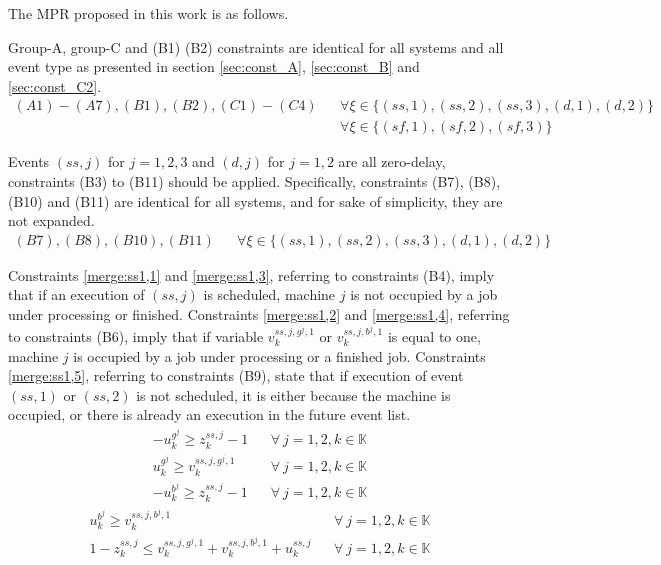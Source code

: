 \documentclass[suppldata]{interact}
\theoremstyle{plain}
\theoremstyle{definition}
\theoremstyle{remark}
\begin{document}
The MPR proposed in this work is as follows.

Group-A, group-C and (B1) (B2) constraints are identical for all systems and all event type as presented in section \ref{sec:const_A},  \ref{sec:const_B} and \ref{sec:const_C2}. 
\begin{eqnarray}
	(A1)-(A7),(B1),(B2),(C1)-(C4) && \forall \xi \in\{(ss,1),(ss,2),(ss,3),(d,1),(d,2)\}\nonumber\\
	&&  \forall\xi \in\{(sf,1),(sf,2),(sf,3)\}\nonumber
\end{eqnarray}

Events $({ss,j})$ for $j=1,2,3$ and $({d,j})$ for $j=1,2$ are all zero-delay, constraints (B3) to (B11) should be applied. Specifically, constraints (B7), (B8), (B10) and (B11) are identical for all systems, and for sake of simplicity, they are not expanded. 
\begin{eqnarray}
	(B7),(B8),(B10),(B11)&& \forall \xi \in\{(ss,1),(ss,2),(ss,3),(d,1),(d,2)\}\nonumber
\end{eqnarray}

Constraints \eqref{merge:ss1,1} and \eqref{merge:ss1,3}, referring to constraints (B4), imply that if an execution of ${(ss,j)}$ is scheduled, machine $j$ is not occupied by a job under processing or finished. Constraints \eqref{merge:ss1,2} and \eqref{merge:ss1,4}, referring to constraints (B6), imply that if variable $v^{ss,j,g^j,1}_k$ or $v^{ss,j,b^j,1}_k$ is equal to one, machine $j$ is occupied by a job under processing or a finished job. Constraints \eqref{merge:ss1,5}, referring to constraints (B9), state that if execution of event ${(ss,1)}$ or ${(ss,2)}$ is not scheduled, it is either because the machine is occupied, or there is already an execution in the future event list. 
\begin{eqnarray}
	-u^{g^j}_k\ge z^{ss,j}_k-1&& \forall\ j=1,2,k\in \mathbb{K}\label{merge:ss1,1}\\
	u^{g^j}_k\ge v^{ss,j,g^j,1}_k&& \forall\ j=1,2,k\in \mathbb{K}\label{merge:ss1,2}\\
		-u^{b^j}_k\ge z^{ss,j}_k-1&& \forall\ j=1,2,k\in \mathbb{K}\label{merge:ss1,3}
\end{eqnarray}
\begin{eqnarray}
	u^{b^j}_k\ge v^{ss,j,b^j,1}_k&& \forall\ j=1,2,k\in \mathbb{K}\label{merge:ss1,4}\\
	1-z^{ss,j}_k\le v^{ss,j,g^j,1}_k+v^{ss,j,b^j,1}_k+u^{ss,j}_k&& \forall\ j=1,2,k\in \mathbb{K}\label{merge:ss1,5}
\end{eqnarray}
\end{document}
